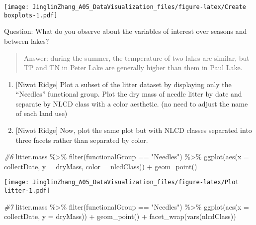 \documentclass[
]{article}
\newenvironment{Shaded}{\begin{snugshade}}{\end{snugshade}}
\newcommand{\AttributeTok}[1]{\textcolor[rgb]{0.77,0.63,0.00}{#1}}
\newcommand{\CommentTok}[1]{\textcolor[rgb]{0.56,0.35,0.01}{\textit{#1}}}
\newcommand{\FunctionTok}[1]{\textcolor[rgb]{0.00,0.00,0.00}{#1}}
\newcommand{\NormalTok}[1]{#1}
\newcommand{\SpecialCharTok}[1]{\textcolor[rgb]{0.00,0.00,0.00}{#1}}
\newcommand{\StringTok}[1]{\textcolor[rgb]{0.31,0.60,0.02}{#1}}
\begin{document}
\texttt{[image: JinglinZhang\_A05\_DataVisualization\_files/figure-latex/Create boxplots-1.pdf]}

Question: What do you observe about the variables of interest over
seasons and between lakes?

\begin{quote}
Answer: during the summer, the temperature of two lakes are similar, but
TP and TN in Peter Lake are generally higher than them in Paul Lake.
\end{quote}

\begin{enumerate}
\def\labelenumi{\arabic{enumi}.}
\setcounter{enumi}{5}
\item
  {[}Niwot Ridge{]} Plot a subset of the litter dataset by displaying
  only the ``Needles'' functional group. Plot the dry mass of needle
  litter by date and separate by NLCD class with a color aesthetic. (no
  need to adjust the name of each land use)
\item
  {[}Niwot Ridge{]} Now, plot the same plot but with NLCD classes
  separated into three facets rather than separated by color.
\end{enumerate}

\begin{Shaded}
\begin{Highlighting}[]
\CommentTok{\#6}
\NormalTok{litter.mass }\SpecialCharTok{\%\textgreater{}\%} 
  \FunctionTok{filter}\NormalTok{(functionalGroup }\SpecialCharTok{==} \StringTok{"Needles"}\NormalTok{) }\SpecialCharTok{\%\textgreater{}\%} 
  \FunctionTok{ggplot}\NormalTok{(}\FunctionTok{aes}\NormalTok{(}\AttributeTok{x =}\NormalTok{ collectDate, }\AttributeTok{y =}\NormalTok{ dryMass, }\AttributeTok{color =}\NormalTok{ nlcdClass)) }\SpecialCharTok{+}
  \FunctionTok{geom\_point}\NormalTok{()}
\end{Highlighting}
\end{Shaded}

\texttt{[image: JinglinZhang\_A05\_DataVisualization\_files/figure-latex/Plot litter-1.pdf]}

\begin{Shaded}
\begin{Highlighting}[]
\CommentTok{\#7}
\NormalTok{litter.mass }\SpecialCharTok{\%\textgreater{}\%} 
  \FunctionTok{filter}\NormalTok{(functionalGroup }\SpecialCharTok{==} \StringTok{"Needles"}\NormalTok{) }\SpecialCharTok{\%\textgreater{}\%} 
  \FunctionTok{ggplot}\NormalTok{(}\FunctionTok{aes}\NormalTok{(}\AttributeTok{x =}\NormalTok{ collectDate, }\AttributeTok{y =}\NormalTok{ dryMass)) }\SpecialCharTok{+}
  \FunctionTok{geom\_point}\NormalTok{() }\SpecialCharTok{+}
  \FunctionTok{facet\_wrap}\NormalTok{(}\FunctionTok{vars}\NormalTok{(nlcdClass))}
\end{Highlighting}
\end{Shaded}
\end{document}
